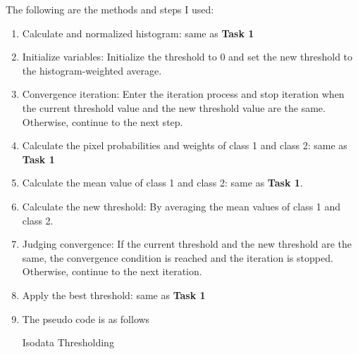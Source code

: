 \documentclass[11pt]{report}
\begin{document}
The following are the methods and steps I used:

\begin{enumerate}
    \item Calculate and normalized histogram: same as \textbf{Task 1}
    \item Initialize variables: Initialize the threshold to 0 and set the new threshold to the histogram-weighted average.
    \item Convergence iteration: Enter the iteration process and stop iteration when the current threshold value and the new threshold value are the same. Otherwise, continue to the next step.
    \item Calculate the pixel probabilities and weights of class 1 and class 2: same as \textbf{Task 1}
    \item Calculate the mean value of class 1 and class 2: same as \textbf{Task 1}.
    \item Calculate the new threshold: By averaging the mean values of class 1 and class 2.
    \item Judging convergence: If the current threshold and the new threshold are the same, the convergence condition is reached and the iteration is stopped. Otherwise, continue to the next iteration.
    \item Apply the best threshold: same as \textbf{Task 1}
    \item The pseudo code is as follows

    \begin{algorithm}[H]
        \SetAlgoLined
        \caption{Isodata Thresholding}
    \end{algorithm}

\end{enumerate}
\end{document}
